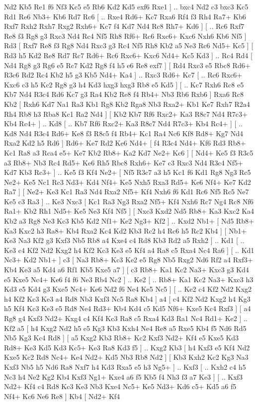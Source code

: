 Nd2 Kb5  Re1 f6  Nf3 Kc5  e5 Rb6  Kd2 Kd5  exf6 Rxe1   ] .. bxc4    Nd2   c3    bxc3   Kc5    Rd1   Re6    Nb3+   Kb6    Rd7   Rc6 [ .. Rxe4  Rd6+ Kc7  Rxa6 Rf4  f3 Rh4  Ra7+ Kb6  Rxf7 Rxh2  Rxh7 Rxg2  Rxh6+ Kc7  f4 Kd7  Nd4 Rc8  Rh7+ Kd6   ]  [ .. Rc6  Rxf7 Re8  f3 Rg8  g3 Rxc3  Nd4 Rc4  Nf5 Rh8  Rf6+ Rc6  Rxc6+ Kxc6  Nxh6 Kb6  Nf5   ]  Rd3 [  Rxf7 Re8  f3 Rg8  Nd4 Rxc3  g3 Rc4  Nf5 Rh8  Kb2 a5  Ne3 Rc6  Nd5+ Kc5   ]  [  Rd3 h5  Kd2 Re8  Rd7 Rc7  Rd6+ Rc6  Rxc6+ Kxc6  Nd4+ Kc5  Kd3   ] .. Rc4    Rd4 [  Nd4 Rg8  g3 Rg6  e5 Rc7  Kd2 Rg8  f4 h5  e6 Re8  exf7   ]  [  Rd4 Rxc3  e5 Rbc8  Rd6+ R3c6  Rd2 Rc4  Kb2 h5  g3 Kb5  Nd4+ Ka4   ] .. Rxc3    Rd6+   Kc7 [ .. Rc6  Rxc6+ Kxc6  c3 h5  Kc2 Rg8  g3 h4  Kd3 hxg3  hxg3 Rb8  e5 Kd5   ]  [ .. Kc7  Rxh6 Rc8  e5 Kb7  Nd4 R3c4  Rd6 Kc7  g3 Ra4  Kb2 Re8  f4 Rb4+  Nb3 Rb6  Rxb6   ]  Rxa6   Rc8    Kb2 [  Rxh6 Kd7  Na1 Ra3  Kb1 Rg8  Kb2 Rga8  Nb3 Rxa2+  Kb1 Ke7  Rxh7 R2a4  Rh4 Rb8  h3 Rba8  Kc1 Ra2  Nd4   ]  [  Kb2 Kb7  Rf6 Rxc2+  Ka3 R8c7  Nd4 R7c3+  Kb4 Rc4+   ] .. Kd8 [ .. Kb7  Rf6 Rxc2+  Ka3 R8c7  Nd4 R7c3+  Kb4 Rc4+   ]  [ .. Kd8  Nd4 R3c4  Rd6+ Ke8  f3 R8c5  f4 Rb4+  Kc1 Ra4  Nc6 Kf8  Rd8+ Kg7  Nd4 Rxa2  Kd2 h5  Rd6   ]  Rd6+   Ke7    Rd2   Ke6    Nd4+ [  f4 R3c4  Nd4+ Kf6  Rd3 Rb8+  Kc1 Ra8  a3 Rca4  e5+ Ke7  Kb2 Rb8+  Ka2 Kd7  Ne2+ Kc6   ]  [  Nd4+ Ke5  f3 R3c5  a3 Rb8+  Nb3 Rc4  Rd5+ Ke6  Rh5 Rbc8  Rxh6+ Ke7  c3 Rxc3  Nd4 R3c4  Nf5+ Kd7  Kb3 Rc3+   ] .. Ke5    f3   Kf4    Ne2+ [  Nf5 R3c7  a3 h5  Kc1 f6  Kd1 Rg8  Ng3 Rc5  Ne2+ Ke5  Nc1 Rc3  Nd3+ Kd4  Nf4+ Ke5  Nxh5 Rxa3  Rd5+ Ke6  Nf4+ Ke7  Kd2 Ra7   ]  [  Ne2+ Ke3  Kc1 Ra3  Nd4 Rxa2  Nf5+ Kf4  Nxh6 f6  Kd1 Rc6  Nf5 Rc5  Ne7 Ke5  c3 Ra3   ] .. Ke3    Nxc3 [  Kc1 Ra3  Ng3 Rxa2  Nf5+ Kf4  Nxh6 Rc7  Ng4 Rc8  Nf6 Ra1+  Kb2 Rh1  Nd5+ Ke5  Ne3 Kf4  Nf5   ]  [  Nxc3 Kxd2  Nd5 Rb8+  Ka3 Kxc2  Ka4 Kb2  a3 Rg8  Ne3 Kc3  Kb5 Kd2  Nf1+ Ke2  Ng3+ Kf2   ] .. Kxd2    Nb1+    [  Nd5 Rb8+  Ka3 Kxc2  h3 Ra8+  Kb4 Rxa2  Kc4 Kd2  Kb3 Rc2  h4 Rc6  h5 Rc2  Kb4   ]  [  Nb1+ Ke3  Na3 Kf2  g3 Kxf3  Nb5 Rb8  a4 Kxe4  c4 Rd8  Kb3 Rd2  a5 Rxh2   ] .. Kd1 [ .. Ke3  c4 Kf2  Nd2 Kxg2  h4 Kf2  Kc3 Ke3  e5 Kf4  a4 Ra8  c5 Rxa4  Nc4 Ra6   ]  [ .. Kd1  Nc3+ Kd2  Nb1+   ]  c3 [  Na3 Rb8+  Kc3 Ke2  e5 Rg8  Nb5 Rxg2  Nd6 Rf2  a4 Rxf3+  Kb4 Ke3  a5 Kd4  a6 Rf1  Kb5 Kxe5  a7   ]  [  c3 Rb8+  Ka1 Kc2  Na3+ Kxc3  g3 Kd4  e5 Kxe5  Nc4+ Ke6  f4 f6  Ne3 Rb4  Nc2   ] .. Ke2 [ .. Rb8+  Ka1 Kc2  Na3+ Kxc3  h3 Kd3  e5 Kd4  g3 Kxe5  Nc4+ Ke6  Nd2 f6  Ne4 Ke5  Nc5   ]  [ .. Ke2  c4 Kf2  Nd2 Kxg2  h4 Kf2  Kc3 Ke3  a4 Rd8  Nb3 Kxf3  Nc5 Ra8  Kb4   ]  a4 [  c4 Kf2  Nd2 Kxg2  h4 Kg3  h5 Kf4  Kc3 Ke3  e5 Rd8  Ne4 Rd3+  Kb4 Kd4  c5 Kd5  Nf6+ Kxe5  Kc4 Rxf3   ]  [  a4 Rg8  g4 Kxf3  Nd2+ Kxg4  c4 Kf4  Kc3 Ra8  c5 Rxa4  Kd3 Ra1  Nc4 Rd1+  Ke2   ] .. Kf2    a5 [  h4 Kxg2  Nd2 h5  e5 Kg3  Kb3 Kxh4  Ne4 Re8  a5 Rxe5  Kb4 f5  Nd6 Rd5  Nb5 Kg3  Kc4 Rd8   ]  [  a5 Kxg2  Kb3 Rb8+  Kc2 Kxf3  Nd2+ Kf4  e5 Kxe5  Kd3 Rd8+  Ke3 Kd5  Kd3 Kc5+  Ke3 Ra8  Kd3 f5   ] .. Kxg2    Kb3 [  h4 Kxf3  e5 Kf4  Nd2 Kxe5  Kc2 Rd8  Nc4+ Ke4  Nd2+ Kd5  Nb3 Rb8  Nd2   ]  [  Kb3 Kxh2  Kc2 Kg3  Na3 Kxf3  Nb5 h5  Nd6 Ra8  Nxf7 h4  Kd3 Rxa5  e5 h3  Ng5+   ] .. Kxf3 [ .. Kxh2  c4 h5  Nc3 h4  Ne2 Kg2  Kb4 Kxf3  Ng1+ Kxe4  a6 f5  Kb5 f4  Nh3 f3  a7 Ke3   ]  [ .. Kxf3  Nd2+ Kf4  c4 Rd8  Kc3 Ke3  Nb3 Kxe4  Nc5+ Ke5  Nd3+ Kd6  c5+ Kd5  a6 f5  Nf4+ Kc6  Ne6 Re8   ]  Kb4 [  Nd2+ Kf4  
